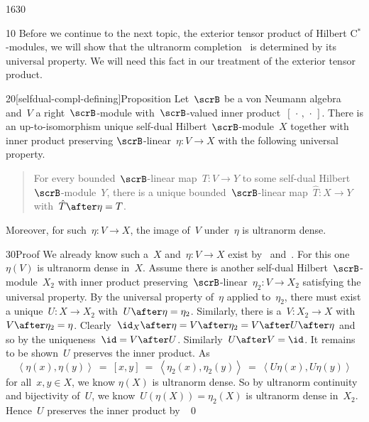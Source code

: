\begin{parsec}{1630}%
\begin{point}{10}%
Before we continue to the next topic,
    the exterior tensor product of Hilbert C$^*$-modules,
    we will show that the ultranorm completion~
    is determined by its universal property.
    We will need this fact in our treatment
        of the exterior tensor product.
\end{point}
\begin{point}{20}[selfdual-compl-defining]{Proposition}%
Let~$\scrB$ be a von Neumann algebra and~$V$ a right~$\scrB$-module
    with~$\scrB$-valued inner product~$[\,\cdot\,,\,\cdot\,]$.
There is an up-to-isomorphism unique
    self-dual Hilbert~$\scrB$-module~$X$
    together with inner product preserving $\scrB$-linear~$\eta \colon V \to X$
    with the following universal property.
    \begin{quote}
    For every bounded~$\scrB$-linear map~$T\colon V \to Y$
    to some self-dual Hilbert~$\scrB$-module~$Y$,
    there is a unique bounded~$\scrB$-linear map~$\hat{T}\colon X \to Y$
    with~$\hat{T} \after \eta = T$.
    \end{quote}
Moreover, for such~$\eta\colon V \to X$,
    the image of~$V$ under~$\eta$ is ultranorm dense.
\begin{point}{30}{Proof}%
We already know such a~$X$ and~$\eta\colon V \to X$
    exist by~
    and~.
For this one~$\eta(V)$ is ultranorm dense in~$X$.
Assume there is another self-dual Hilbert~$\scrB$-module~$X_2$
    with inner product preserving~$\scrB$-linear~$\eta_2\colon V \to X_2$
    satisfying the universal property.
By the universal property of~$\eta$ applied to~$\eta_2$,
    there must exist a unique~$U \colon X  \to X_2$
    with~$U \after \eta  = \eta_2$.
Similarly, there is a~$V \colon X_2 \to X$
    with~$V \after \eta_2 = \eta$.
Clearly~$\id_{X} \after \eta = V \after \eta_2 = V \after U \after \eta$
    and so by the uniqueness~$\id = V\after U$.
    Similarly~$U \after V = \id$.
It remains to be shown~$U$ preserves the inner product.
As
\begin{equation*}
    \left<\eta(x),\eta(y)\right>
    \ =\  [x,y]
    \ =\  \left<\eta_2(x), \eta_2(y)\right>
    \ =\  \left<U \eta(x), U \eta(y)\right>
\end{equation*}
for all~$x,y \in X$, we know
$\eta(X)$ is ultranorm dense.
So by ultranorm continuity and bijectivity of~$U$,
    we know~$U(\eta(X)) = \eta_2(X)$ is ultranorm dense in~$X_2$.
Hence~$U$ preserves the inner product by~
\qed
\end{point}
\end{point}
\end{parsec}

